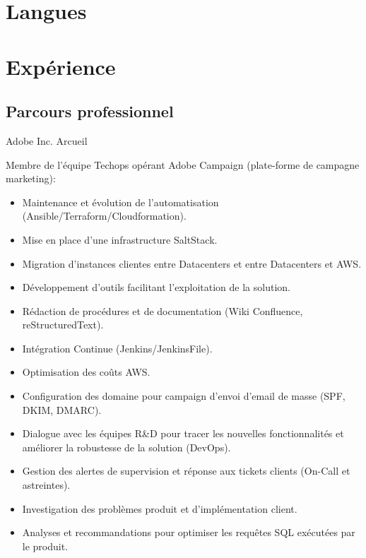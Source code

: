 \documentclass[10pt,a4paper,sans]{moderncv}        %
\begin{document}
\section{Langues}


\section{Expérience}
\subsection{Parcours professionnel}


              {Adobe Inc.}
              {Arcueil}
              {}
	      {Membre de l'équipe Techops opérant Adobe Campaign (plate-forme de campagne marketing):
                 \begin{itemize}
                 \item Maintenance et évolution de l'automatisation (Ansible/Terraform/Cloudformation).
                 \item Mise en place d'une infrastructure SaltStack.
                 \item Migration d'instances clientes entre Datacenters et entre Datacenters et AWS.
                 \item Développement d'outils facilitant l'exploitation de la solution.
                 \item Rédaction de procédures et de documentation (Wiki Confluence, reStructuredText).
		 \item Intégration Continue (Jenkins/JenkinsFile).
                 \item Optimisation des coûts AWS.
		 \item Configuration des domaine pour campaign d'envoi d'email de masse (SPF, DKIM, DMARC).
                 \item Dialogue avec les équipes R\&D pour tracer les nouvelles fonctionnalités et améliorer la robustesse de la solution (DevOps).
                 \item Gestion des alertes de supervision et réponse aux tickets clients (On-Call et astreintes).
                 \item Investigation des problèmes produit et d'implémentation client.
		 \item Analyses et recommandations pour optimiser les requêtes SQL exécutées par le produit.
                 \end{itemize}
              }
\end{document}
